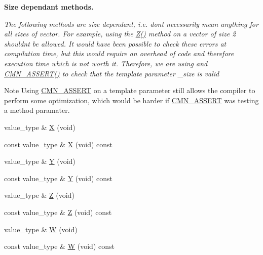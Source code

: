 \begin{Indent}{\bf Size dependant methods.}\par
{\em The following methods are size dependant, i.\+e. don\textquotesingle{}t necessarily mean anything for all sizes of vector. For example, using the \hyperlink{classvct_fixed_size_vector_base_a15c85340aa4eb4a1d5be6c40aa3702fe}{Z()} method on a vector of size 2 shouldn\textquotesingle{}t be allowed. It would have been possible to check these errors at compilation time, but this would require an overhead of code and therefore execution time which is not worth it. Therefore, we are using and \hyperlink{group__cisst_common_ga6a12b7031ea38ac5bf5937b8633c97ff}{C\+M\+N\+\_\+\+A\+S\+S\+E\+R\+T()} to check that the template parameter \+\_\+size is valid

\begin{DoxyNote}{Note}
Using \hyperlink{group__cisst_common_ga6a12b7031ea38ac5bf5937b8633c97ff}{C\+M\+N\+\_\+\+A\+S\+S\+E\+R\+T} on a template parameter still allows the compiler to perform some optimization, which would be harder if \hyperlink{group__cisst_common_ga6a12b7031ea38ac5bf5937b8633c97ff}{C\+M\+N\+\_\+\+A\+S\+S\+E\+R\+T} was testing a method paramater. 
\end{DoxyNote}
}\begin{DoxyCompactItemize}
\item 
value\+\_\+type \& \hyperlink{classvct_fixed_size_vector_base_a0f03468446ec3e6e38c52a1c9253c116}{X} (void)
\item 
const value\+\_\+type \& \hyperlink{classvct_fixed_size_vector_base_a47cb86c954e7b93c4b4c05f8256a2252}{X} (void) const 
\item 
value\+\_\+type \& \hyperlink{classvct_fixed_size_vector_base_af456c20051ca3d523b2350fa6834b465}{Y} (void)
\item 
const value\+\_\+type \& \hyperlink{classvct_fixed_size_vector_base_a8ed11e57bfe5289a8069936dea3cf08c}{Y} (void) const 
\item 
value\+\_\+type \& \hyperlink{classvct_fixed_size_vector_base_a15c85340aa4eb4a1d5be6c40aa3702fe}{Z} (void)
\item 
const value\+\_\+type \& \hyperlink{classvct_fixed_size_vector_base_af90d527c98dcfaf6307afd7b7592b255}{Z} (void) const 
\item 
value\+\_\+type \& \hyperlink{classvct_fixed_size_vector_base_a89aba41dcc523b3614229db3acf507dd}{W} (void)
\item 
const value\+\_\+type \& \hyperlink{classvct_fixed_size_vector_base_a0714b81a2b9ad92ee9dcb8f2baaec0c0}{W} (void) const 

\end{DoxyCompactItemize}
\end{Indent}
